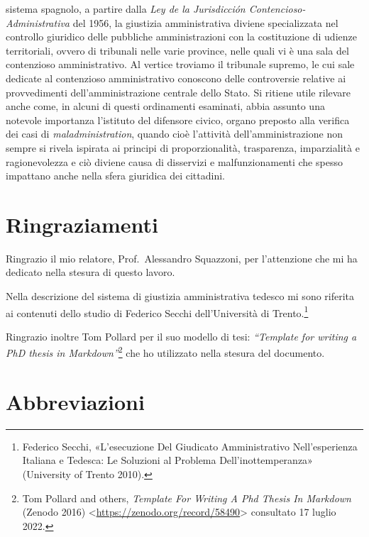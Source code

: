 \documentclass[12pt,it,a4paper,]{report}
\begin{document}
sistema spagnolo, a partire dalla \emph{Ley de la Jurisdicción
Contencioso-Administrativa} del 1956, la giustizia amministrativa
diviene specializzata nel controllo giuridico delle pubbliche
amministrazioni con la costituzione di udienze territoriali, ovvero di
tribunali nelle varie province, nelle quali vi è una sala del
contenzioso amministrativo. Al vertice troviamo il tribunale supremo, le
cui sale dedicate al contenzioso amministrativo conoscono delle
controversie relative ai provvedimenti dell'amministrazione centrale
dello Stato. Si ritiene utile rilevare anche come, in alcuni di questi
ordinamenti esaminati, abbia assunto una notevole importanza l'istituto
del difensore civico, organo preposto alla verifica dei casi di
\emph{maladministration}, quando cioè l'attività dell'amministrazione
non sempre si rivela ispirata ai principi di proporzionalità,
trasparenza, imparzialità e ragionevolezza e ciò diviene causa di
disservizi e malfunzionamenti che spesso impattano anche nella sfera
giuridica dei cittadini.

\hypertarget{ringraziamenti}{%
\chapter*{Ringraziamenti}\label{ringraziamenti}}

Ringrazio il mio relatore, Prof.~Alessandro Squazzoni, per l'attenzione
che mi ha dedicato nella stesura di questo lavoro.

Nella descrizione del sistema di giustizia amministrativa tedesco mi
sono riferita ai contenuti dello studio di Federico Secchi
dell'Università di Trento.\footnote{Federico Secchi, {«L'esecuzione Del
  Giudicato Amministrativo Nell'esperienza Italiana e Tedesca: Le
  Soluzioni al Problema Dell'inottemperanza»} ({University of Trento}
  2010).}

Ringrazio inoltre Tom Pollard per il suo modello di tesi:
\emph{``Template for writing a PhD thesis in Markdown''}\footnote{Tom
  Pollard and others, \emph{Template {For Writing A Phd Thesis In
  Markdown}} ({Zenodo} 2016)
  \textless{}\url{https://zenodo.org/record/58490}\textgreater{}
  consultato 17 luglio 2022.} che ho utilizzato nella stesura del
documento.

\newpage


\tableofcontents

\newpage

\hypertarget{abbreviazioni}{%
\chapter*{Abbreviazioni}\label{abbreviazioni}}
\end{document}
